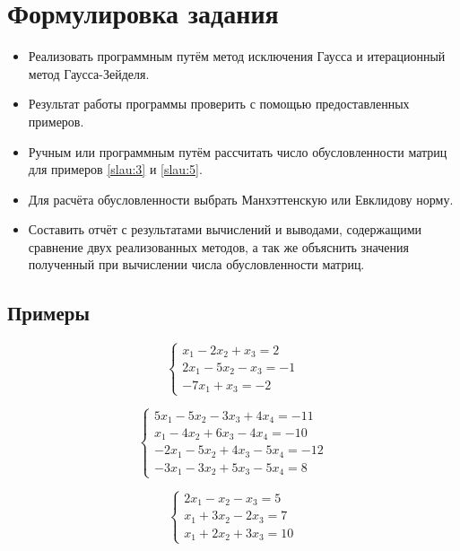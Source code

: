 \documentclass[a4paper]{article}
\begin{document}
\section{Формулировка задания}
\begin{itemize}
    \item Реализовать программным путём метод исключения Гаусса и итерационный метод Гаусса-Зейделя. 
    \item Результат работы программы проверить с помощью предоставленных примеров.
    \item Ручным или программным путём рассчитать число обусловленности матриц для примеров \eqref{slau:3} и \eqref{slau:5}.
    \item Для расчёта обусловленности выбрать Манхэттенскую или Евклидову норму.
    \item Составить отчёт с результатами вычислений и выводами, содержащими сравнение двух реализованных методов, а так же объяснить значения полученный при вычислении числа обусловленности матриц.
\end{itemize}

\subsection{Примеры}

\begin{equation}
    \begin{cases*}
           x_1  -2 x_2 + x_3 = 2 \\
         2 x_1  -5 x_2 - x_3 = -1 \\
        -7 x_1  +  x_3       = -2
    \end{cases*} \label{slau:1}
\end{equation}

\begin{equation}
    \begin{cases}
         5 x_1 -5 x_2 -3 x_3 +4 x_4 = -11 \\
           x_1 -4 x_2 +6 x_3 -4 x_4 = -10 \\
        -2 x_1 -5 x_2 +4 x_3 -5 x_4 = -12 \\
        -3 x_1 -3 x_2 +5 x_3 -5 x_4 = 8
    \end{cases} \label{slau:2}
\end{equation}

\begin{equation}
    \begin{cases*}
        2 x_1 -   x_2 -   x_3 = 5 \\
          x_1 + 3 x_2 - 2 x_3 = 7 \\
          x_1 + 2 x_2 + 3 x_3 = 10
    \end{cases*} \label{slau:3}
\end{equation}
\end{document}
